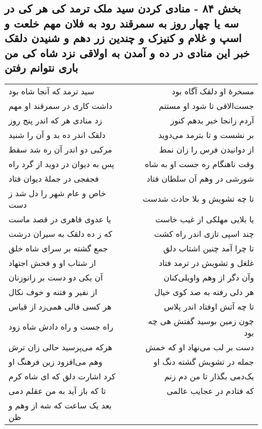 \begin{center}
\section*{بخش ۸۴ - منادی کردن سید ملک ترمد کی هر کی در سه یا چهار روز به سمرقند رود به فلان مهم خلعت و اسپ و غلام و کنیزک و چندین زر دهم و شنیدن دلقک خبر این منادی در ده و آمدن به اولاقی نزد شاه کی من باری نتوانم رفتن}
\label{sec:sh084}
\begin{longtable}{l p{0.5cm} r}
سید ترمد که آنجا شاه بود
&&
مسخرهٔ او دلقک آگاه بود
\\
داشت کاری در سمرقند او مهم
&&
جست‌الاقی تا شود او مستتم
\\
زد منادی هر که اندر پنج روز
&&
آردم زانجا خبر بدهم کنوز
\\
دلقک اندر ده بد و آن را شنید
&&
بر نشست و تا بترمد می‌دوید
\\
مرکبی دو اندر آن ره شد سقط
&&
از دوانیدن فرس را زان نمط
\\
پس به دیوان در دوید از گرد راه
&&
وقت ناهنگام ره جست او به شاه
\\
فجفجی در جملهٔ دیوان فتاد
&&
شورشی در وهم آن سلطان فتاد
\\
خاص و عام شهر را دل شد ز دست
&&
تا چه تشویش و بلا حادث شدست
\\
یا عدوی قاهری در قصد ماست
&&
یا بلایی مهلکی از غیب خاست
\\
که ز ده دلقک به سیران درشت
&&
چند اسپی تازی اندر راه کشت
\\
جمع گشته بر سرای شاه خلق
&&
تا چرا آمد چنین اشتاب دلق
\\
از شتاب او و فحش اجتهاد
&&
غلغل و تشویش در ترمد فتاد
\\
آن یکی دو دست بر زانوزنان
&&
وآن دگر از وهم واویلی‌کنان
\\
از نفیر و فتنه و خوف نکال
&&
هر دلی رفته به صد کوی خیال
\\
هر کسی فالی همی‌زد از قیاس
&&
تا چه آتش اوفتاد اندر پلاس
\\
راه جست و راه دادش شاه زود
&&
چون زمین بوسید گفتش هی چه بود
\\
هرکه می‌پرسید حالی زان ترش
&&
دست بر لب می‌نهاد او که خمش
\\
وهم می‌افزود زین فرهنگ او
&&
جمله در تشویش گشته دنگ او
\\
کرد اشارت دلق که ای شاه کرم
&&
یک‌دمی بگذار تا من دم زنم
\\
تا که باز آید به من عقلم دمی
&&
که فتادم در عجایب عالمی
\\
بعد یک ساعت که شه از وهم و ظن
&&

\end{longtable}
\end{center}
